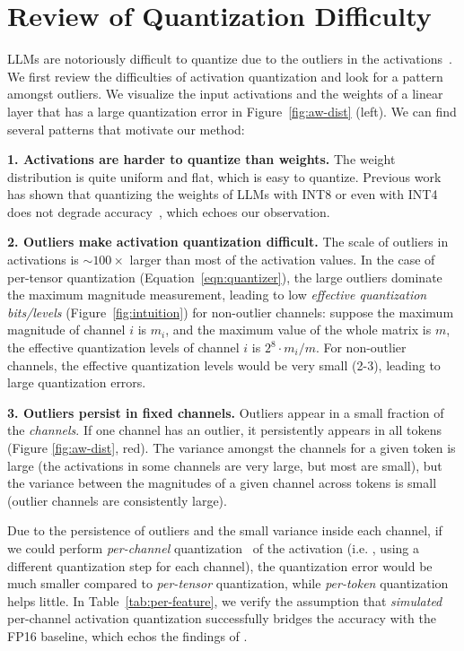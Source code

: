 \section{Review of Quantization Difficulty} LLMs are notoriously difficult to quantize due to the outliers in the activations~\citep{dettmers2022llmint8,outlier_suppression,bondarenko2021understanding}. We first review the difficulties of activation quantization and look for a pattern amongst outliers. We visualize the input activations and the weights of a linear layer that has a large quantization error in Figure~\ref{fig:aw-dist} (left). We can find several patterns that motivate our method:

\textbf{1. Activations are harder to quantize than weights. } The weight distribution is quite uniform and flat, which is easy to quantize. Previous work has shown that quantizing the weights of LLMs with INT8 or even with INT4 does not degrade accuracy~\cite{dettmers2022llmint8,zeroquant,zeng2022glm}, which echoes our observation.

\textbf{2. Outliers make activation quantization difficult.} The scale of outliers in activations is $\sim 100\times$ larger than most of the activation values. In the case of per-tensor quantization (Equation~\ref{eqn:quantizer}), the large outliers dominate the maximum magnitude measurement, leading to low \emph{effective quantization bits/levels} (Figure~\ref{fig:intuition}) for non-outlier channels: suppose the maximum magnitude of channel $i$ is $m_i$, and the maximum value of the whole matrix is $m$, the effective quantization levels of channel $i$ is $2^8 \cdot m_i/m$. For non-outlier channels, the effective quantization levels would be very small (2-3), leading to large quantization errors.

\textbf{3. Outliers persist in fixed channels. } Outliers appear in a small fraction of the \emph{channels}. If one channel has an outlier, it persistently appears in all tokens (Figure \ref{fig:aw-dist}, red). The variance amongst the channels for a given token is large (the activations in some channels are very large, but most are small), but the variance between the magnitudes of a given channel across tokens is small (outlier channels are consistently large).

\newcommand{\textgray}[1]{\textcolor{mylightgray}{{#1}}}

Due to the persistence of outliers and the small variance inside each channel, if we could perform \emph{per-channel} quantization~\cite{bondarenko2021understanding} of the activation (i.e. , using a different quantization step for each channel), the quantization error would be much smaller compared to \emph{per-tensor} quantization, while \emph{per-token} quantization helps little. In Table~\ref{tab:per-feature}, we verify the assumption that \textit{simulated} per-channel activation quantization successfully bridges the accuracy with the FP16 baseline, which echos the findings of \citeauthor{bondarenko2021understanding}.

